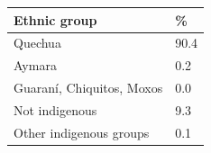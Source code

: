 \documentclass{article}
\begin{document}
\begin{tabular}{ll}
\toprule
Ethnic group & \% \\
\midrule
Quechua & 90.4 \\
Aymara & 0.2 \\
Guaraní, Chiquitos, Moxos & 0.0 \\
Not indigenous & 9.3 \\
Other indigenous groups & 0.1 \\
\bottomrule
\end{tabular}
\end{document}

